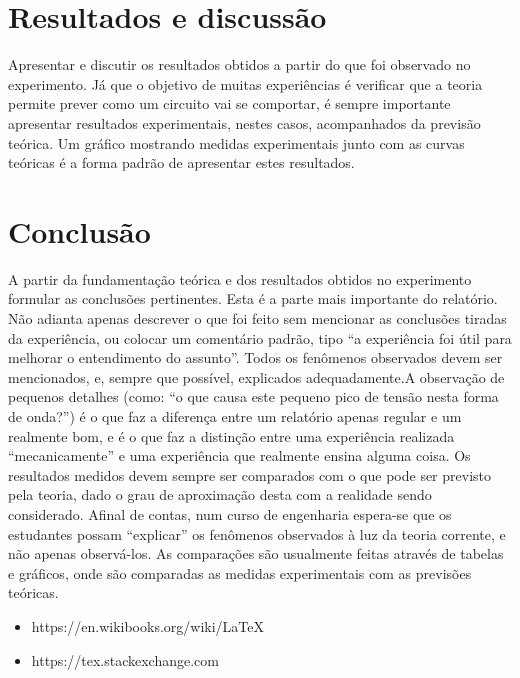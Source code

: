 \documentclass[10pt,conference]{IEEEtran}                      %
\begin{document}
\section{Resultados e discussão}
Apresentar e discutir os resultados obtidos a partir do que foi observado no experimento. Já que o objetivo de muitas experiências é verificar que a teoria permite prever como um circuito vai se comportar, é sempre importante apresentar resultados experimentais, nestes casos, acompanhados da previsão teórica. Um gráfico mostrando medidas experimentais junto com as curvas teóricas é a forma padrão de apresentar estes resultados.~\cite{lamport94}
\section{Conclusão}
A partir da fundamentação teórica e dos resultados obtidos no experimento formular as conclusões pertinentes. Esta é a parte mais importante do relatório. Não adianta apenas descrever o que foi feito sem mencionar as conclusões tiradas da experiência, ou colocar um comentário padrão, tipo “a experiência foi útil para melhorar o entendimento do assunto”. Todos os fenômenos observados devem ser mencionados, e, sempre que possível, explicados adequadamente.A observação de pequenos detalhes (como: “o que causa este pequeno pico de tensão nesta forma de onda?”) é o que faz a diferença entre um relatório apenas regular e um realmente bom, e é o que faz a distinção entre uma experiência realizada “mecanicamente” e uma experiência que realmente ensina alguma coisa. Os resultados medidos devem sempre ser comparados com o que pode ser previsto pela teoria, dado o grau de aproximação desta com a realidade sendo considerado. Afinal de contas, num curso de engenharia espera-se que os estudantes possam “explicar” os fenômenos observados à luz da teoria corrente, e não apenas observá-los. As comparações são usualmente feitas através de tabelas e gráficos, onde são comparadas as medidas experimentais com as previsões teóricas.
\begin{itemize}
	\item https://en.wikibooks.org/wiki/LaTeX
	\item https://tex.stackexchange.com
\end{itemize}


\end{document}
